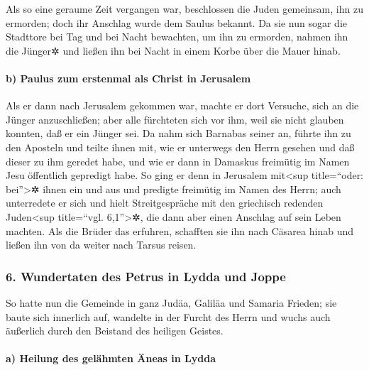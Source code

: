  Als so eine geraume Zeit vergangen war, beschlossen die
Juden gemeinsam, ihn zu ermorden;  doch ihr Anschlag
wurde dem Saulus bekannt. Da sie nun sogar die Stadttore bei Tag und bei
Nacht bewachten, um ihn zu ermorden,  nahmen ihn die
Jünger✲ und ließen ihn bei Nacht in einem Korbe über die Mauer hinab.

\hypertarget{b-paulus-zum-erstenmal-als-christ-in-jerusalem}{%
\paragraph{b) Paulus zum erstenmal als Christ in
Jerusalem}\label{b-paulus-zum-erstenmal-als-christ-in-jerusalem}}

 Als er dann nach Jerusalem gekommen war, machte er dort
Versuche, sich an die Jünger anzuschließen; aber alle fürchteten sich
vor ihm, weil sie nicht glauben konnten, daß er ein Jünger sei.
 Da nahm sich Barnabas seiner an, führte ihn zu den
Aposteln und teilte ihnen mit, wie er unterwegs den Herrn gesehen und
daß dieser zu ihm geredet habe, und wie er dann in Damaskus freimütig im
Namen Jesu öffentlich gepredigt habe.  So ging er denn in
Jerusalem mit\textless sup title=``oder: bei''\textgreater✲ ihnen ein
und aus und predigte freimütig im Namen des Herrn;  auch
unterredete er sich und hielt Streitgespräche mit den griechisch
redenden Juden\textless sup title=``vgl. 6,1''\textgreater✲, die dann
aber einen Anschlag auf sein Leben machten.  Als die
Brüder das erfuhren, schafften sie ihn nach Cäsarea hinab und ließen ihn
von da weiter nach Tarsus reisen.

\hypertarget{wundertaten-des-petrus-in-lydda-und-joppe}{%
\subsubsection{6. Wundertaten des Petrus in Lydda und
Joppe}\label{wundertaten-des-petrus-in-lydda-und-joppe}}

 So hatte nun die Gemeinde in ganz Judäa, Galiläa und
Samaria Frieden; sie baute sich innerlich auf, wandelte in der Furcht
des Herrn und wuchs auch äußerlich durch den Beistand des heiligen
Geistes.

\hypertarget{a-heilung-des-geluxe4hmten-uxe4neas-in-lydda}{%
\paragraph{a) Heilung des gelähmten Äneas in
Lydda}\label{a-heilung-des-geluxe4hmten-uxe4neas-in-lydda}}

